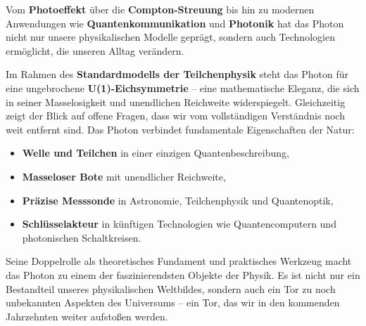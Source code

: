 Vom \textbf{Photoeffekt} über die \textbf{Compton-Streuung} bis hin zu modernen Anwendungen wie \textbf{Quantenkommunikation} und \textbf{Photonik} hat das Photon nicht nur unsere physikalischen Modelle geprägt, sondern auch Technologien ermöglicht, die unseren Alltag verändern.

Im Rahmen des \textbf{Standardmodells der Teilchenphysik} steht das Photon für eine ungebrochene \textbf{U(1)-Eichsymmetrie} – eine mathematische Eleganz, die sich in seiner Masselosigkeit und unendlichen Reichweite widerspiegelt.  
Gleichzeitig zeigt der Blick auf offene Fragen, dass wir vom vollständigen Verständnis noch weit entfernt sind.
\newpage
\noindent
Das Photon verbindet fundamentale Eigenschaften der Natur:
\begin{itemize}
	\item \textbf{Welle und Teilchen} in einer einzigen Quantenbeschreibung,
	\item \textbf{Masseloser Bote} mit unendlicher Reichweite,
	\item \textbf{Präzise Messsonde} in Astronomie, Teilchenphysik und Quantenoptik,
	\item \textbf{Schlüsselakteur} in künftigen Technologien wie Quantencomputern und photonischen Schaltkreisen.
\end{itemize}

Seine Doppelrolle als theoretisches Fundament und praktisches Werkzeug macht das Photon zu einem der faszinierendsten Objekte der Physik.  
Es ist nicht nur ein Bestandteil unseres physikalischen Weltbildes, sondern auch ein Tor zu noch unbekannten Aspekten des Universums – ein Tor, das wir in den kommenden Jahrzehnten weiter aufstoßen werden.



